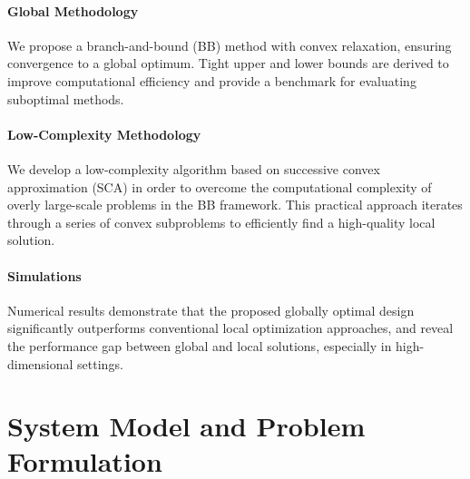 \documentclass[runningheads]{llncs}
\begin{document}
\paragraph{Global Methodology} 
We propose a branch-and-bound (BB) method with convex relaxation, ensuring convergence to a global optimum. Tight upper and lower bounds are derived to improve computational efficiency and provide a benchmark for evaluating suboptimal methods.

\paragraph{Low-Complexity Methodology} 
We develop a low-complexity algorithm based on successive convex approximation (SCA) in order to overcome the computational complexity of overly large-scale problems in the BB framework. This practical approach iterates through a series of convex subproblems to efficiently find a high-quality local solution.

\paragraph{Simulations} Numerical results demonstrate that the proposed globally optimal design significantly outperforms conventional local optimization approaches, and reveal the performance gap between global and local solutions, especially in high-dimensional settings.

\section{System Model and Problem Formulation}
\end{document}
